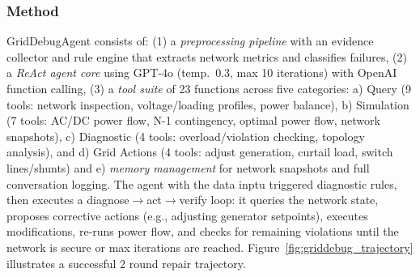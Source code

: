 \documentclass[journal,onecolumn]{IEEEtran} %
\begin{document}
\subsubsection*{\textbf{Method}}
GridDebugAgent consists of: (1) a \textit{preprocessing pipeline} with an evidence collector and rule engine that extracts network metrics and classifies failures, (2) a \textit{ReAct agent core} using GPT-4o (temp.\ 0.3, max 10 iterations) with OpenAI function calling, (3) a \textit{tool suite} of 23 functions across five categories: a) Query (9 tools: network inspection, voltage/loading profiles, power balance), b) Simulation (7 tools: AC/DC power flow, N-1 contingency, optimal power flow, network snapshots), c) Diagnostic (4 tools: overload/violation checking, topology analysis), and d) Grid Actions (4 tools: adjust generation, curtail load, switch lines/shunts) and  e) \textit{memory management} for network snapshots and full conversation logging. The agent with the data inptu triggered diagnostic rules, then executes a diagnose$\to$act$\to$verify loop: it queries the network state, proposes corrective actions (e.g., adjusting generator setpoints), executes modifications, re-runs power flow, and checks for remaining violations until the network is secure or max iterations are reached. Figure~\ref{fig:griddebug_trajectory} illustrates a successful 2 round repair trajectory. 
\end{document}
